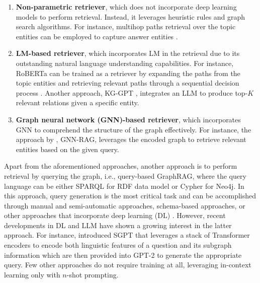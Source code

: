 \begin{enumerate}
    \item \textbf{Non-parametric retriever}, which does not incorporate deep learning models to perform retrieval. Instead, it leverages heuristic rules and graph search algorithms. For instance, multihop paths retrieval over the topic entities can be employed to capture answer entities \citep{yasunaga-etal-2021-qa,grapeqa}.
    \item \textbf{LM-based retriever}, which incorporates LM in the retrieval due to its outstanding natural language understanding capabilities. For instance, RoBERTa \citep{liu2019robertarobustlyoptimizedbert} can be trained as a retriever by expanding the paths from the topic entities and retrieving relevant paths through a sequential decision process \citep{Zhang_2022}. Another approach, KG-GPT \citep{kim-etal-2023-kg}, integrates an LLM to produce top-$K$ relevant relations given a specific entity.
    \item \textbf{Graph neural network (GNN)-based retriever}, which incorporates GNN to comprehend the structure of the graph effectively. For instance, the approach by \cite{mavromatis2024gnnraggraphneuralretrieval}, GNN-RAG, leverages the encoded graph to retrieve relevant entities based on the given query.
\end{enumerate}

Apart from the aforementioned approaches, another approach is to perform retrieval by querying the graph, i.e., query-based GraphRAG, where the query language can be either SPARQL for RDF data model or Cypher for Neo4j. In this approach, query generation is the most critical task and can be accomplished through manual and semi-automatic approaches, schema-based approaches, or other approaches that incorporate deep learning (DL) \citep{ronysgpt}. However, recent developments in DL and LLM have shown a growing interest in the latter approach. For instance, \cite{ronysgpt} introduced SGPT that leverages a stack of Transformer encoders to encode both linguistic features of a question and its subgraph information which are then provided into GPT-2 \citep{radford2019language} to generate the appropriate query. Few other approaches \citep{emonet2024llmbasedsparqlquerygeneration,Kovriguina2023SPARQLGENOP} do not require training at all, leveraging in-context learning only with $n$-shot prompting.

